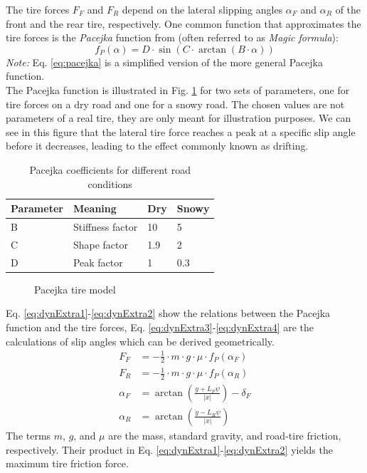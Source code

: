 The tire forces $F_F$ and $F_R$ depend on the lateral slipping angles $\alpha_F$ and $\alpha_R$ of the front and the rear tire, respectively. One common function that approximates the tire forces is the \emph{Pacejka} function from \cite{pacejka1987} (often referred to as \emph{Magic formula}):
\begin{equation}\label{eq:pacejka}
f_P(\alpha) = D\cdot\sin(C\cdot\arctan(B\cdot\alpha))
\end{equation}
\emph{Note:} Eq. \eqref{eq:pacejka} is a simplified version of the more general Pacejka function.\\
The Pacejka function is illustrated in Fig. \ref{fig:Pacejka} for two sets of parameters, one for tire forces on a dry road and one for a snowy road. The chosen values are not parameters of a real tire, they are only meant for illustration purposes. We can see in this figure that the lateral tire force reaches a peak at a specific slip angle before it decreases, leading to the effect commonly known as drifting.
\begin{table}[h!]
\centering
\caption{Pacejka coefficients for different road conditions}
\begin{tabular}{l|l|l|l}
Parameter & Meaning & Dry & Snowy\\
\hline
B & Stiffness factor & 10 & 5\\
C & Shape factor & 1.9 & 2\\
D & Peak factor & 1 & 0.3
\end{tabular}
\label{tab:pacejka}
\end{table}

\begin{figure}[ht]
	\centering
  	
	\caption{Pacejka tire model}
	\label{fig:Pacejka}
\end{figure}
Eq. \eqref{eq:dynExtra1}-\eqref{eq:dynExtra2} show the relations between the Pacejka function and the tire forces, Eq. \eqref{eq:dynExtra3}-\eqref{eq:dynExtra4} are the calculations of slip angles which can be derived geometrically.
\begin{subequations}\label{eq:dynExtra}
\begin{align}
    F_F &= -\frac{1}{2}\cdot m\cdot g\cdot \mu \cdot f_P(\alpha_F)\label{eq:dynExtra1}\\
    F_R &= -\frac{1}{2}\cdot m\cdot g\cdot \mu \cdot f_P(\alpha_R)\label{eq:dynExtra2}\\
    \alpha_F &= \arctan\left(\frac{\dot y+L_F\dot\psi}{\lvert\dot x\lvert}\right) - \delta_F\label{eq:dynExtra3}\\
    \alpha_R &= \arctan\left(\frac{\dot y-L_R\dot\psi}{\lvert\dot x\rvert}\right)\label{eq:dynExtra4}
\end{align}
\end{subequations}
The terms $m$, $g$, and $\mu$ are the mass, standard gravity, and road-tire friction, respectively. Their product in Eq. \eqref{eq:dynExtra1}-\eqref{eq:dynExtra2} yields the maximum tire friction force.

